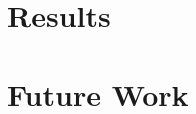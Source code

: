 \documentclass{report}
\begin{document}

\section{Results}


\section{Future Work}


\nocite{*}
\printbibliography
\end{document}
